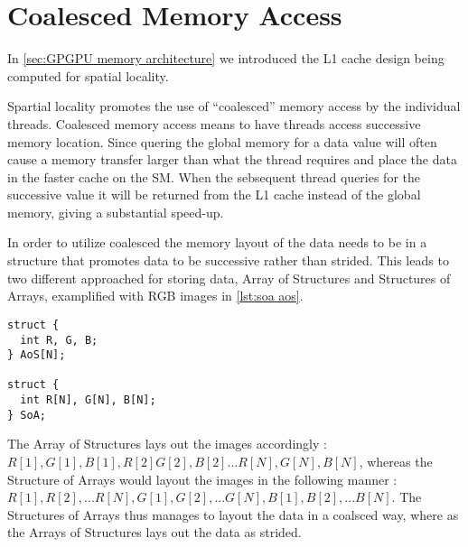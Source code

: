 \section{Coalesced Memory Access}
\label{sec:coalesced}

In \cref{sec:GPGPU memory architecture} we introduced the L1 cache design being computed for spatial locality.

Spartial locality promotes the use of ``coalesced'' memory access by the individual threads.
Coalesced memory access means to have threads access successive memory location.
Since quering the global memory for a data value will often cause a memory transfer larger than what the thread requires and place the data in the faster cache on the SM.
When the sebsequent thread queries for the successive value it will be returned from the L1 cache instead of the global memory, giving a substantial speed-up.

In order to utilize coalesced the memory layout of the data needs to be in a structure that promotes data to be successive rather than strided.\cite{udacity}
This leads to two different approached for storing data, Array of Structures and Structures of Arrays, examplified with RGB images in \cref{lst:soa aos}.

\begin{lstlisting}[caption={Example of SoA and AoS with RGB images}, label={lst:soa aos}]
struct {
  int R, G, B;
} AoS[N];

struct {
  int R[N], G[N], B[N];
} SoA;
\end{lstlisting}

The Array of Structures lays out the images accordingly : $R[1], G[1], B[1], R[2] G[2], B[2] ... R[N], G[N], B[N]$, whereas the Structure of Arrays would layout the images in the following manner : $R[1], R[2], ... R[N], G[1], G[2], ... G[N], B[1], B[2], ... B[N]$.
The Structures of Arrays thus manages to layout the data in a coalsced way, where as the Arrays of Structures lays out the data as strided.
